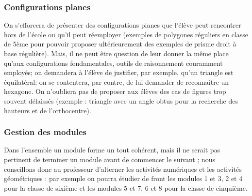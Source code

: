 \subsubsection*{Configurations planes}
On s'efforcera de présenter des configurations planes que l'élève peut rencontrer hors de l'école ou qu'il peut réemployer (exemples de polygones réguliers en
classe de 5ème pour pouvoir proposer ultérieurement des exemples de prisme droit à base régulière). Mais, il ne peut être question de leur donner la même place qu'aux
configurations fondamentales, outils de raisonnement couramment employés; on demandera à l'élève de justifier, par exemple, qu'un triangle est équilatéral; on se
contentera, par contre, de lui demander de reconnaître un hexagone. On n'oubliera pas de proposer aux élèves des cas de figures trop souvent délaissés (exemple :
triangle avec un angle obtus pour la recherche des hauteurs et de l'orthocentre).
\subsubsection{Gestion des modules}
Dans l'ensemble un module forme un tout cohérent, mais il ne serait pas pertinent de terminer un module avant de commencer le suivant ; nous conseillons donc
au professeur d'alterner les activités numériques et les activités géométriques : par exemple on pourra étudier de front les modules 1 et 3, 2 et 4 pour la classe de sixième
et les modules 5 et 7, 6 et 8 pour la classe de cinquième.